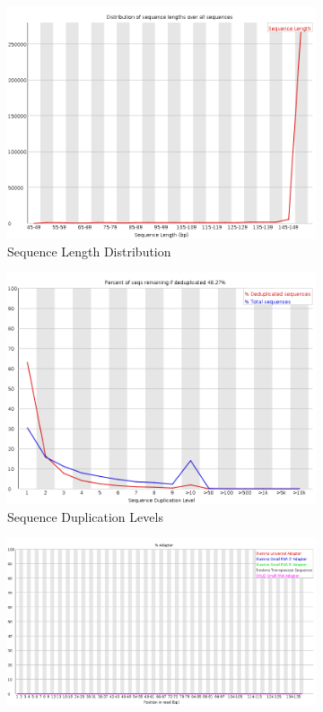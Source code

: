 \documentclass{article}
\begin{document}
\begin{figure}[htbp]
\ContinuedFloat
\centering
\begin{subfigure}{0.45\linewidth}
\includegraphics[width=\linewidth]{04-R1.qfilter_fastqc/Images/sequence_length_distribution.png}
\caption{Sequence Length Distribution}
\end{subfigure}
\begin{subfigure}{0.45\linewidth}
\includegraphics[width=\linewidth]{04-R1.qfilter_fastqc/Images/duplication_levels.png}
\caption{Sequence Duplication Levels}
\end{subfigure}
\begin{subfigure}{0.45\linewidth}
\includegraphics[width=\linewidth]{04-R1.qfilter_fastqc/Images/adapter_content.png}

\end{subfigure}
\end{figure}
\end{document}
